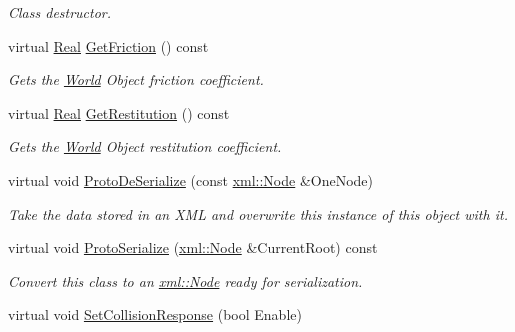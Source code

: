 \begin{DoxyCompactItemize}
\begin{DoxyCompactList}\small\item\em Class destructor. \item\end{DoxyCompactList}\item 
virtual \hyperlink{namespaceMezzanine_a726731b1a7df72bf3583e4a97282c6f6}{Real} \hyperlink{classMezzanine_1_1NonTriggerPhysicsSettings_a8a26cd19ebf73d58b52c794665c66c79}{GetFriction} () const 
\begin{DoxyCompactList}\small\item\em Gets the \hyperlink{classMezzanine_1_1World}{World} Object friction coefficient. \item\end{DoxyCompactList}\item 
virtual \hyperlink{namespaceMezzanine_a726731b1a7df72bf3583e4a97282c6f6}{Real} \hyperlink{classMezzanine_1_1NonTriggerPhysicsSettings_afcd2fa0a18a77f08d95f5824f94a8d1b}{GetRestitution} () const 
\begin{DoxyCompactList}\small\item\em Gets the \hyperlink{classMezzanine_1_1World}{World} Object restitution coefficient. \item\end{DoxyCompactList}\item 
virtual void \hyperlink{classMezzanine_1_1NonTriggerPhysicsSettings_aef475cdfe28b1f2ee121b64d32d6f0a6}{ProtoDeSerialize} (const \hyperlink{classMezzanine_1_1xml_1_1Node}{xml::Node} \&OneNode)
\begin{DoxyCompactList}\small\item\em Take the data stored in an XML and overwrite this instance of this object with it. \item\end{DoxyCompactList}\item 
virtual void \hyperlink{classMezzanine_1_1NonTriggerPhysicsSettings_a7a09c93f7d14a7aeec7ae261bd4d4ea5}{ProtoSerialize} (\hyperlink{classMezzanine_1_1xml_1_1Node}{xml::Node} \&CurrentRoot) const 
\begin{DoxyCompactList}\small\item\em Convert this class to an \hyperlink{classMezzanine_1_1xml_1_1Node}{xml::Node} ready for serialization. \item\end{DoxyCompactList}\item 
virtual void \hyperlink{classMezzanine_1_1NonTriggerPhysicsSettings_a4812a17ef87c192ee6204e216334c878}{SetCollisionResponse} (bool Enable)

\end{DoxyCompactItemize}
